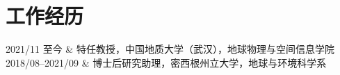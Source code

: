 \section{工作经历}

\begin{EntriesTable}{0.18}{0.02}{0.80}
2021/11 至今     & 特任教授，中国地质大学（武汉），地球物理与空间信息学院 \\
2018/08--2021/09 & 博士后研究助理，密西根州立大学，地球与环境科学系 \\
\end{EntriesTable}
